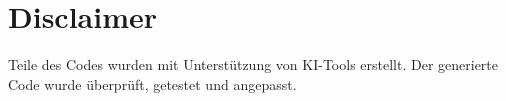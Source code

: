 \documentclass[a4paper, 11pt]{article}          %
\begin{document}
\section*{Disclaimer}
Teile des Codes wurden mit Unterstützung von KI-Tools erstellt. 
Der generierte Code wurde überprüft, getestet und angepasst.



\end{document}
